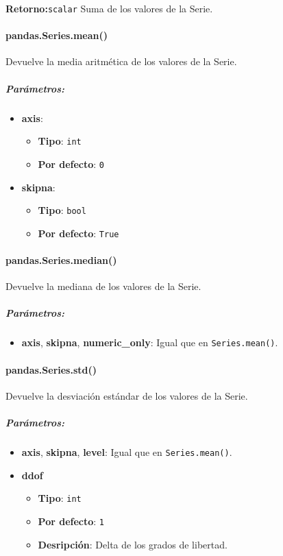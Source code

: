 \textbf{Retorno:}\texttt{scalar} Suma de los valores de la Serie.

\paragraph{pandas.Series.mean()} Devuelve la media aritmética de los valores de
la Serie.

\subparagraph{Parámetros:}
\begin{itemize}
    \item \textbf{axis}:
          \begin{itemize}
              \item \textbf{Tipo}: \texttt{int}
              \item \textbf{Por defecto}: \texttt{0}
          \end{itemize}
    \item \textbf{skipna}:
          \begin{itemize}
              \item \textbf{Tipo}: \texttt{bool}
              \item \textbf{Por defecto}: \texttt{True}
          \end{itemize}
\end{itemize}

\paragraph{pandas.Series.median()} Devuelve la mediana de los valores de la
Serie.

\subparagraph{Parámetros:}
\begin{itemize}
    \item \textbf{axis}, \textbf{skipna}, \textbf{numeric\_only}: Igual que en
          \texttt{Series.mean()}.
\end{itemize}

\paragraph{pandas.Series.std()} Devuelve la desviación estándar de los valores
de la Serie.

\subparagraph{Parámetros:}
\begin{itemize}
    \item \textbf{axis}, \textbf{skipna}, \textbf{level}: Igual que en
          \texttt{Series.mean()}.
    \item \textbf{ddof}
          \begin{itemize}
              \item \textbf{Tipo}: \texttt{int}
              \item \textbf{Por defecto}: \texttt{1}
              \item \textbf{Desripción}: Delta de los grados de libertad.
          \end{itemize}
\end{itemize}

